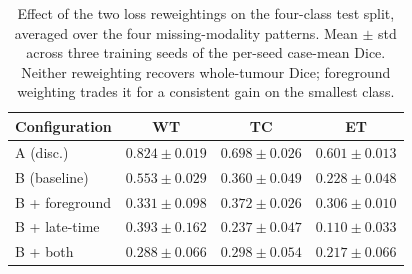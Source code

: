 \begin{table}[t]
\centering
\caption{Effect of the two loss reweightings on the four-class test split, averaged over the four missing-modality patterns. Mean $\pm$ std across three training seeds of the per-seed case-mean Dice. Neither reweighting recovers whole-tumour Dice; foreground weighting trades it for a consistent gain on the smallest class.}
\label{tab:remedy}
\begin{tabular}{lccc}
\toprule
Configuration & WT & TC & ET \\
\midrule
A (disc.) & $0.824\pm0.019$ & $0.698\pm0.026$ & $0.601\pm0.013$ \\
B (baseline) & $0.553\pm0.029$ & $0.360\pm0.049$ & $0.228\pm0.048$ \\
B + foreground & $0.331\pm0.098$ & $0.372\pm0.026$ & $0.306\pm0.010$ \\
B + late-time & $0.393\pm0.162$ & $0.237\pm0.047$ & $0.110\pm0.033$ \\
B + both & $0.288\pm0.066$ & $0.298\pm0.054$ & $0.217\pm0.066$ \\
\bottomrule
\end{tabular}
\end{table}
